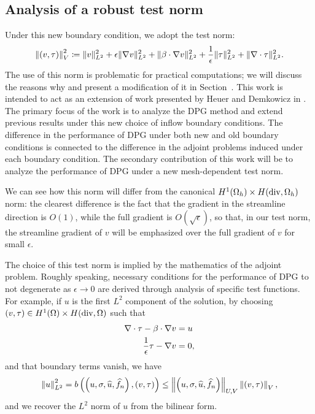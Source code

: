 \subsection{Analysis of a robust test norm}
Under this new boundary condition, we adopt the test norm:
\[
\left\|\left(v,\tau\right)\right\|^2_V \coloneqq \|v\|_{L^2}^2 + \epsilon\|\grad v\|_{L^2}^2 + \|\beta \cdot \grad v\|_{L^2}^2  + \frac{1}{\epsilon}\|\tau\|_{L^2}^2 + \|\div \tau\|_{L^2}^2.
\]
The use of this norm is problematic for practical computations; we will discuss the reasons why and present a modification of it in Section~. This work is intended to act as an extension of work presented by Heuer and Demkowicz in \cite{DPGrobustness}. The primary focus of the work is to analyze the DPG method and extend previous results under this new choice of inflow boundary conditions. The difference in the performance of DPG under both new and old boundary conditions is connected to the difference in the adjoint problems induced under each boundary condition. The secondary contribution of this work will be to analyze the performance of DPG under a new mesh-dependent test norm. 

We can see how this norm will differ from the canonical $H^1(\Omega_h)\times H({\rm div},\Omega_h)$ norm: the clearest difference is the fact that the gradient in the streamline direction is $O(1)$, while the full gradient is $O(\sqrt{\epsilon})$, so that, in our test norm, the streamline gradient of $v$ will be emphasized over the full gradient of $v$ for small $\epsilon$. 

The choice of this test norm is implied by the mathematics of the adjoint problem. Roughly speaking, necessary conditions for the performance of DPG to not degenerate as $\epsilon \rightarrow 0$ are derived through analysis of specific test functions. For example, if $u$ is the first $L^2$ component of the solution, by choosing $(v,\tau) \in H^1(\Omega) \times H({\rm div},\Omega)$ such that 
\begin{align*}
\div \tau - \beta \cdot \grad v &= u \\
\frac{1}{\epsilon} \tau - \grad v &= 0,
\end{align*}
and that boundary terms vanish, we have
\[
 \nor{u}_{L^2}^2 = b\left(\left(u,\sigma,\widehat{u},\widehat{f}_n\right),\left(v,\tau\right)\right) \leq \nor{\left(u,\sigma,\widehat{u},\widehat{f}_n\right)}_{U,V} \nor{\left(v,\tau\right)}_V,
\]
and we recover the $L^2$ norm of $u$ from the bilinear form.


